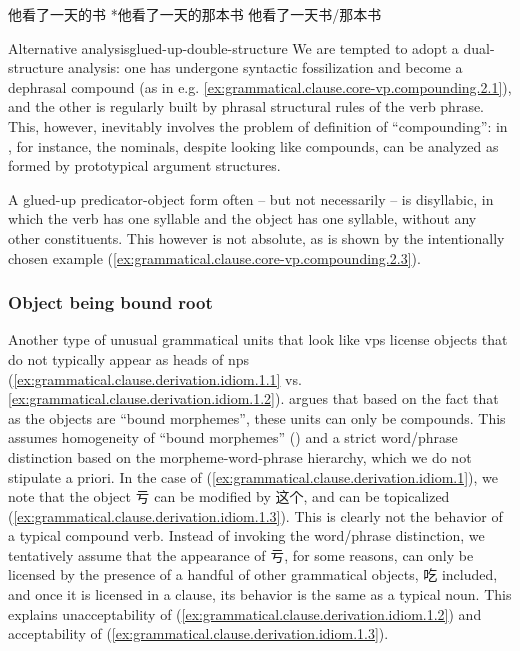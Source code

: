 \documentclass[UTF8, a4paper, oneside, scheme=plain, 12pt]{ctexrep}
\newcommand*{\citepage}[1]{p.~{#1}}
\begin{document}
\begin{exe}
    \ex\label{ex:grammatical.clause.derivation.glued-up.pseudo-attributive.1}
    \begin{xlist}
        \ex\label{ex:grammatical.clause.derivation.glued-up.pseudo-attributive.1.1} 他看了一天的书
        \ex\label{ex:grammatical.clause.derivation.glued-up.pseudo-attributive.1.2} *他看了一天的那本书
        \ex\label{ex:grammatical.clause.derivation.glued-up.pseudo-attributive.1.3} 他看了一天书/那本书
    \end{xlist}
\end{exe}

\begin{infobox}{Alternative analysis}{glued-up-double-structure}
    We are tempted to adopt a dual-structure analysis:
    one has undergone syntactic fossilization and become a dephrasal compound
    (as in e.g. \ref{ex:grammatical.clause.core-vp.compounding.2.1}), 
    and the other is regularly built by phrasal structural rules of the verb phrase.
    This, however, inevitably involves the problem of definition of ``compounding'':
    in , for instance,
    the nominals, despite looking like compounds, can be analyzed as
    formed by prototypical argument structures.
\end{infobox}

A glued-up predicator-object form often -- but not necessarily -- is disyllabic,
in which the verb has one syllable and the object has one syllable,
without any other constituents.
This however is not absolute, as is shown by the intentionally chosen example (\ref{ex:grammatical.clause.core-vp.compounding.2.3}).

\subsubsection{Object being bound root}\label{sec:grammatical.clause.core-vp.derivation.object-bound}

Another type of unusual grammatical units that look like \acp{vp} 
license objects that do not typically appear as heads of \acp{np}
(\ref{ex:grammatical.clause.derivation.idiom.1.1} vs. \ref{ex:grammatical.clause.derivation.idiom.1.2}).
\citet[\citepage{129}]{zhudexigrammar} argues that based on the fact that 
as the objects are ``bound morphemes'', these units can only be compounds.
This assumes homogeneity of ``bound morphemes'' ()
and a strict word/phrase distinction based on the morpheme-word-phrase hierarchy,
which we do not stipulate a priori.
In the case of (\ref{ex:grammatical.clause.derivation.idiom.1}),
we note that the object 亏 can be modified by 这个,
and can be topicalized (\ref{ex:grammatical.clause.derivation.idiom.1.3}).
This is clearly not the behavior of a typical compound verb.
Instead of invoking the word/phrase distinction,
we tentatively assume that the appearance of 亏,
for some reasons, can only be licensed by the presence of a handful of other grammatical objects,
吃 included, and once it is licensed in a clause,
its behavior is the same as a typical noun.
This explains unacceptability of (\ref{ex:grammatical.clause.derivation.idiom.1.2})
and acceptability of (\ref{ex:grammatical.clause.derivation.idiom.1.3}).
\end{document}
